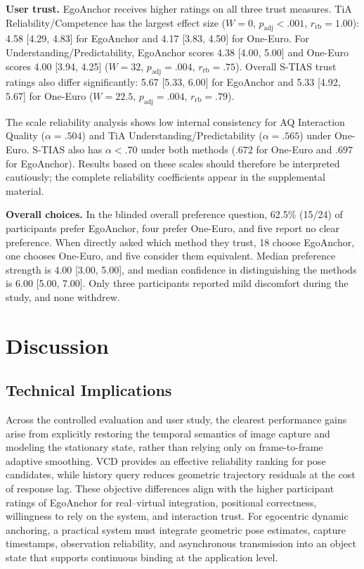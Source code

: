 \documentclass[review]{vgtc}
\begin{document}
\textbf{User trust.}
EgoAnchor receives higher ratings on all three trust measures. TiA Reliability/Competence has the largest effect size ($W=0$, $p_{\mathrm{adj}}<.001$, $r_{\mathrm{rb}}=1.00$): 4.58 [4.29, 4.83] for EgoAnchor and 4.17 [3.83, 4.50] for One-Euro. For Understanding/Predictability, EgoAnchor scores 4.38 [4.00, 5.00] and One-Euro scores 4.00 [3.94, 4.25] ($W=32$, $p_{\mathrm{adj}}=.004$, $r_{\mathrm{rb}}=.75$). Overall S-TIAS trust ratings also differ significantly: 5.67 [5.33, 6.00] for EgoAnchor and 5.33 [4.92, 5.67] for One-Euro ($W=22.5$, $p_{\mathrm{adj}}=.004$, $r_{\mathrm{rb}}=.79$).

The scale reliability analysis shows low internal consistency for AQ Interaction Quality ($\alpha=.504$) and TiA Understanding/Predictability ($\alpha=.565$) under One-Euro. S-TIAS also has $\alpha<.70$ under both methods ($.672$ for One-Euro and $.697$ for EgoAnchor). Results based on these scales should therefore be interpreted cautiously; the complete reliability coefficients appear in the supplemental material.

\textbf{Overall choices.}
In the blinded overall preference question, 62.5\% (15/24) of participants prefer EgoAnchor, four prefer One-Euro, and five report no clear preference. When directly asked which method they trust, 18 choose EgoAnchor, one chooses One-Euro, and five consider them equivalent. Median preference strength is 4.00 [3.00, 5.00], and median confidence in distinguishing the methods is 6.00 [5.00, 7.00]. Only three participants reported mild discomfort during the study, and none withdrew.

\section{Discussion}\label{sec:discussion}

\subsection{Technical Implications}

Across the controlled evaluation and user study, the clearest performance gains arise from explicitly restoring the temporal semantics of image capture and modeling the stationary state, rather than relying only on frame-to-frame adaptive smoothing. VCD provides an effective reliability ranking for pose candidates, while history query reduces geometric trajectory residuals at the cost of response lag. These objective differences align with the higher participant ratings of EgoAnchor for real--virtual integration, positional correctness, willingness to rely on the system, and interaction trust. For egocentric dynamic anchoring, a practical system must integrate geometric pose estimates, capture timestamps, observation reliability, and asynchronous transmission into an object state that supports continuous binding at the application level.
\end{document}
